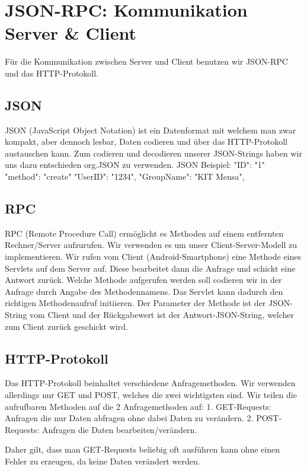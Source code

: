 
\section{JSON-RPC: Kommunikation Server \& Client}
Für die Kommunikation zwischen Server und Client benutzen wir JSON-RPC und das HTTP-Protokoll.

\subsection{JSON}
JSON (JavaScript Object Notation) ist ein Datenformat mit welchem man zwar kompakt, aber dennoch lesbar, Daten codieren und über das HTTP-Protokoll austauschen kann.
Zum codieren und decodieren unserer JSON-Strings haben wir uns dazu entschieden org.JSON zu verwenden.
JSON Beispiel:
{
  "ID": "1"
  "method": "create"	
  "UserID": "1234",
  "GroupName": "KIT Mensa",
}

\subsection{RPC}
RPC (Remote Procedure Call) ermöglicht es Methoden auf einem entfernten Rechner/Server aufzurufen. Wir verwenden es um unser Client-Server-Modell zu implementieren.
Wir rufen vom Client (Android-Smartphone) eine Methode eines Servlets auf dem Server auf. Diese bearbeitet dann die Anfrage und schickt eine Antwort zurück.
Welche Methode aufgerufen werden soll codieren wir in der Anfrage durch Angabe des Methodennamens. Das Servlet kann dadurch den richtigen Methodenaufruf initiieren.
Der Parameter der Methode ist der JSON-String vom Client und der Rückgabewert ist der Antwort-JSON-String, welcher zum Client zurück geschickt wird.


\subsection{HTTP-Protokoll}
Das HTTP-Protokoll beinhaltet verschiedene Anfragemethoden.
Wir verwenden allerdings nur GET und POST, welches die zwei wichtigsten sind.
Wir teilen die aufrufbaren Methoden auf die 2 Anfragemethoden auf:
1. GET-Requests: Anfragen die nur Daten abfragen ohne dabei Daten zu verändern.
2. POST-Requests: Anfragen die Daten bearbeiten/verändern.

Daher gilt, dass man GET-Requests beliebig oft ausführen kann ohne einen Fehler zu erzeugen, da keine Daten verändert werden.


